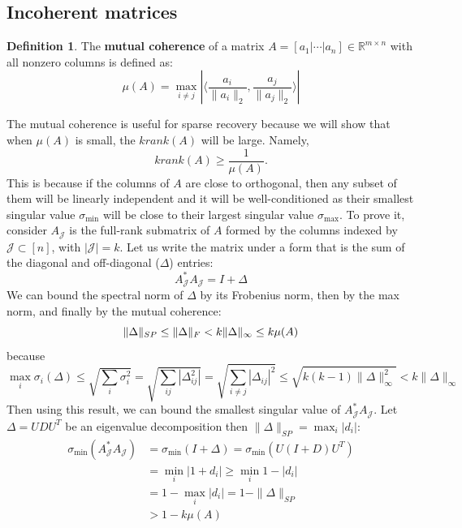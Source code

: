 \documentclass[12pt, openany]{report}
\newcommand{\R}{\mathbb{R}}
\theoremstyle{definition}
\newtheorem{definition}[thm]{Definition}
\begin{document}
\subsection{Incoherent matrices}
\begin{definition}
	The \textbf{mutual coherence} of a matrix $A = \left[ a_1 |\cdots| a_n \right] \in \R^{m \times n}$ with all nonzero columns is defined as:
	\begin{equation}
		\mu(A) = \max_{i \neq j} \left| \langle \frac{a_i}{\|a_i\|_2}, \frac{a_j}{\|a_j\|_2} \rangle \right|
	\end{equation}
\end{definition}
The mutual coherence is useful for sparse recovery because we will show that when $\mu(A)$ is small, the $krank(A)$ will be large. Namely, 
\begin{equation}
	krank(A) \ge \frac{1}{\mu(A)}.
\end{equation}
This is because if the columns of $A$ are close to orthogonal, then any subset of them will be linearly independent and it will be well-conditioned as their smallest singular value $\sigma_{\min}$ will be close to their largest singular value $\sigma_{\max}$. 
To prove it, consider $A_{\mathcal{J}}$ is the full-rank submatrix of $A$ formed by the columns indexed by $\mathcal{J}\subset [n]$, with $|\mathcal{J}| = k$. Let us write the matrix under a form that is the sum of the diagonal and off-diagonal ($\Delta$) entries:
\begin{equation}
	A_{\mathcal{J}}^* A_{\mathcal{J}} = I + \Delta
\end{equation}
We can bound the spectral norm of $\Delta$ by its Frobenius norm, then by the max norm, and finally by the mutual coherence:
\begin{equation}
	\|\Delta\|_{SP} \leq \|\Delta\|_F < k \|\Delta\|_{\infty} \leq k \mu(A)\\
\end{equation}
because
\begin{equation}
	\max_i \sigma_i(\Delta) \le \sqrt{\sum_i\sigma_i^2} = \sqrt{\sum_{ij}|\Delta_{ij}^2|} = \sqrt{\sum_{i\neq j} |\Delta_{ij}|^2} \le \sqrt{k(k-1) \|\Delta\|^2_\infty} < k \|\Delta\|_\infty
\end{equation}
Then using this result, we can bound the smallest singular value of $A_{\mathcal{J}}^*A_{\mathcal{J}}$. Let $\Delta = U D U^T$ be an eigenvalue decomposition then $\|\Delta\|_{SP} = \max_i |d_i|$:
\begin{equation}
	\begin{aligned}
		\sigma_{\min}(A_{\mathcal{J}}^* A_{\mathcal{J}}) &= \sigma_{\min}(I + \Delta) = \sigma_{\min}(U(I + D) U^T)\\
		&= \min_i |1 + d_i| \geq \min_i 1 - |d_i|\\ 
		&= 1 - \max_i |d_i| = 1 - \|\Delta\|_{SP} \\
		&> 1 - k \mu(A)
	\end{aligned}
\end{equation}
\end{document}
